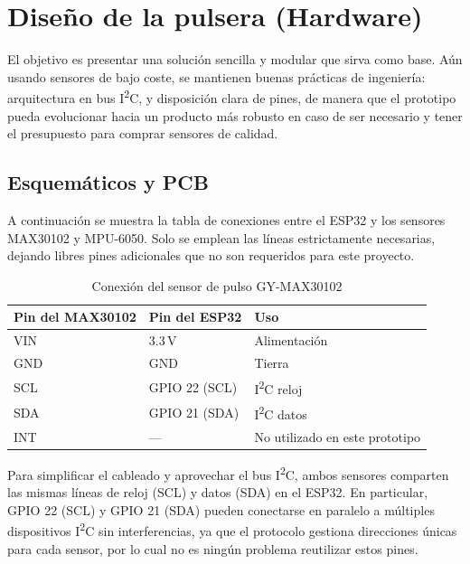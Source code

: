 \documentclass[12pt, a4paper]{article}
\begin{document}
	

\section{Diseño de la pulsera (Hardware)}
	
	El objetivo es presentar una solución sencilla y modular que sirva como base. Aún usando sensores de bajo coste, se mantienen buenas prácticas de ingeniería: arquitectura en bus I\textsuperscript{2}C, y disposición clara de pines, de manera que el prototipo pueda evolucionar hacia un producto más robusto en caso de ser necesario y tener el presupuesto para comprar sensores de calidad.
	
	\subsection{Esquemáticos y PCB}
	
	A continuación se muestra la tabla de conexiones entre el ESP32 y los sensores MAX30102 y MPU-6050. Solo se emplean las líneas estrictamente necesarias, dejando libres pines adicionales que no son requeridos para este proyecto.

	\begin{table}[ht]
		\centering
		\caption{Conexión del sensor de pulso GY-MAX30102}
		\label{tab:conexion_max30102}
		\begin{tabular}{|p{4cm}|p{3cm}|p{5cm}|}
			\hline
			\textbf{Pin del MAX30102} & \textbf{Pin del ESP32}      & \textbf{Uso}                    \\ \hline
			VIN                        & 3.3\,V                       & Alimentación                          \\ \hline
			GND                        & GND                          & Tierra                                   \\ \hline
			SCL                        & GPIO 22 (SCL)                & I\textsuperscript{2}C reloj            \\ \hline
			SDA                        & GPIO 21 (SDA)                & I\textsuperscript{2}C datos            \\ \hline
			INT                        & —                            & No utilizado en este prototipo        \\ \hline
		\end{tabular}
	\end{table}
	
		
	
	Para simplificar el cableado y aprovechar el bus I\textsuperscript{2}C, ambos sensores comparten las mismas líneas de reloj (SCL) y datos (SDA) en el ESP32. En particular, GPIO 22 (SCL) y GPIO 21 (SDA) pueden conectarse en paralelo a múltiples dispositivos I\textsuperscript{2}C sin interferencias, ya que el protocolo gestiona direcciones únicas para cada sensor, por lo cual no es ningún problema reutilizar estos pines.
	
\end{document}
